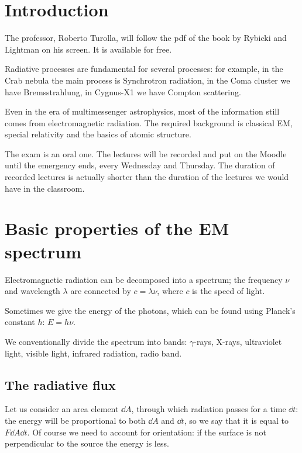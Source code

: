 \documentclass[main.tex]{subfiles}
\begin{document}

\section*{Introduction}

The professor, Roberto Turolla, will follow the pdf of the book by Rybicki and Lightman \cite{rybickiRadiativeProcessesAstrophysics1979} on his screen. It is available for free.

Radiative processes are fundamental for several processes: for example, in the Crab nebula the main process is Synchrotron radiation, in the Coma cluster we have Bremsstrahlung, in Cygnus-X1 we have Compton scattering. 

Even in the era of multimessenger astrophysics, most of the information still comes from electromagnetic radiation. 
The required background is classical EM, special relativity and the basics of atomic structure. 

The exam is an oral one. The lectures will be recorded and put on the Moodle until the emergency ends, every Wednesday and Thursday. 
The duration of recorded lectures is actually shorter than the duration of the lectures we would have in the classroom.

\section{Basic properties of the EM spectrum}

Electromagnetic radiation can be decomposed into a spectrum; the frequency \(\nu \) and wavelength \(\lambda \) are connected by \(c = \lambda \nu \), where \(c\) is the speed of light. 

Sometimes we give the energy of the photons, which can be found using Planck's constant \(h\): \(E = h \nu \). 

We conventionally divide the spectrum into bands: \(\gamma \)-rays, X-rays, ultraviolet light, visible light, infrared radiation, radio band.

\subsection{The radiative flux}

Let us consider an area element \(\dd{A}\), through which radiation passes for a time \(\dd{t}\): the energy will be proportional to both \(\dd{A}\) and \(\dd{t}\), so we say that it is equal to \(F \dd{A} \dd{t}\). Of course we need to account for orientation: if the surface is not perpendicular to the source the energy is less. 
\end{document}
